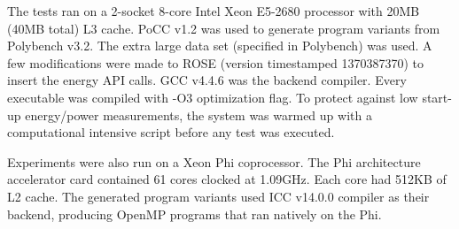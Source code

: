 The tests ran on a 2-socket 8-core Intel Xeon E5-2680 processor with 20MB (40MB total) L3 cache.
PoCC v1.2 was used to generate program variants from Polybench v3.2.
The extra large data set (specified in Polybench) was used. A few modifications were made to
ROSE (version timestamped 1370387370) to insert the energy API calls.
GCC v4.4.6 was the backend compiler. Every executable was compiled with
-O3 optimization flag.  
To protect against low start-up energy/power measurements, the system was warmed up
with a computational intensive script before any test was executed. 

Experiments were also run on a Xeon Phi coprocessor. 
The Phi architecture accelerator card contained 61 cores clocked at 1.09GHz. Each core had 512KB of L2 cache. 
The generated program variants used ICC v14.0.0 compiler as their backend, producing OpenMP programs that ran natively on the Phi.
